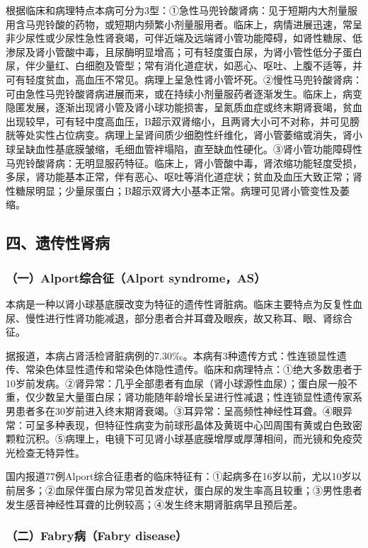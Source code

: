 根据临床和病理特点本病可分为3型：①急性马兜铃酸肾病：见于短期内大剂量服用含马兜铃酸的药物，或短期内频繁小剂量服用者。临床上，病情进展迅速，常呈非少尿性或少尿性急性肾衰竭，可伴近端及远端肾小管功能障碍，如肾性糖尿、低渗尿及肾小管酸中毒，且尿酶明显增高；可有轻度蛋白尿，为肾小管性低分子蛋白尿，伴少量红、白细胞及管型；常有消化道症状，如恶心、呕吐、上腹不适等，并可有轻度贫血，高血压不常见。病理上呈急性肾小管坏死。②慢性马兜铃酸肾病：可由急性马兜铃酸肾病进展而来，或在持续小剂量服药者逐渐发生。临床上，病变隐匿发展，逐渐出现肾小管及肾小球功能损害，呈氮质血症或终末期肾衰竭，贫血出现较早，可有轻中度高血压，B超示双肾缩小，且两肾大小可不对称，并可见膀胱等处实性占位病变。病理上呈肾间质少细胞性纤维化，肾小管萎缩或消失，肾小球呈缺血性基底膜皱缩，毛细血管袢塌陷，直至缺血性硬化。③肾小管功能障碍性马兜铃酸肾病：无明显服药特征。临床上，肾小管酸中毒，肾浓缩功能轻度受损，多尿，肾功能基本正常，伴有恶心、呕吐等消化道症状；贫血及血压大致正常；肾性糖尿明显；少量尿蛋白；B超示双肾大小基本正常。病理可见肾小管变性及萎缩。

\protect\hypertarget{text00294.html}{}{}

\subsection{四、遗传性肾病}

\subsubsection{（一）Alport综合征（Alport syndrome，AS）}

本病是一种以肾小球基底膜改变为特征的遗传性肾脏病。临床主要特点为反复性血尿、慢性进行性肾功能减退，部分患者合并耳聋及眼疾，故又称耳、眼、肾综合征。

据报道，本病占肾活检肾脏病例的7.30‰。本病有3种遗传方式：性连锁显性遗传、常染色体显性遗传和常染色体隐性遗传。临床和病理特点：①绝大多数患者于10岁前发病。②肾异常：几乎全部患者有血尿（肾小球源性血尿）；蛋白尿一般不重，仅少数呈大量蛋白尿；肾功能随年龄增长呈进行性减退；性连锁显性遗传家系男患者多在30岁前进入终末期肾衰竭。③耳异常：呈高频性神经性耳聋。④眼异常：可呈多种表现，但特征性病变为前球形晶体及黄斑中心凹周围有黄或白色致密颗粒沉积。⑤病理上，电镜下可见肾小球基底膜增厚或厚薄相间，而光镜和免疫荧光检查无特异性。

国内报道77例Alport综合征患者的临床特征有：①起病多在16岁以前，尤以10岁以前居多；②血尿伴蛋白尿为常见首发症状，蛋白尿的发生率高且较重；③男性患者发生感音神经性耳聋的比例较高；④发生终末期肾脏病早且预后差。

\subsubsection{（二）Fabry病（Fabry disease）}

